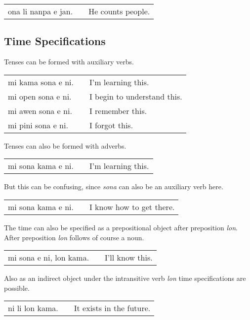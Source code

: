 \begin{supertabular}{p{5,5cm}|ll}
    ona li nanpa e jan. &  & He counts people. \\
\end{supertabular}

\subsection*{Time Specifications}
Tenses can be formed with auxiliary verbs.

\begin{supertabular}{p{5,5cm}|ll}
    mi kama sona e ni. &  & I'm learning this.          \\
    mi open sona e ni. &  & I begin to understand this. \\
    mi awen sona e ni. &  & I remember this.            \\
    mi pini sona e ni. &  & I forgot this.              \\
\end{supertabular}

Tenses can also be formed with adverbs.

\begin{supertabular}{p{5,5cm}|ll}
    mi sona kama e ni. &  & I'm learning this. \\
\end{supertabular}

But this can be confusing, since \textit{sona} can also be an auxiliary verb here.

\begin{supertabular}{p{5,5cm}|ll}
    mi sona kama e ni. &  & I know how to get there. \\
\end{supertabular}

The time can also be specified as a prepositional object after preposition \textit{lon}.
After preposition \textit{lon} follows of course a noun.

\begin{supertabular}{p{5,5cm}|ll}
    mi sona e ni, lon kama. &  & I'll know this. \\
\end{supertabular}

Also as an indirect object under the intransitive verb \textit{lon} time specifications are possible.

\begin{supertabular}{p{5,5cm}|ll}
    ni li lon kama. &  & It exists in the future. \\
\end{supertabular}

